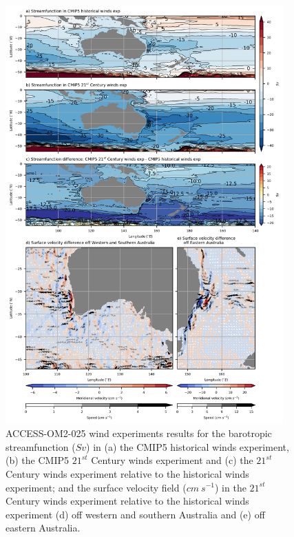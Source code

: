 \documentclass[draft,linenumbers]{agujournal2018}
\begin{document}
\begin{figure}[h]
\centering
\includegraphics[width=0.95\textwidth]{Bar_fig1_.png}
\caption{ACCESS-OM2-025 wind experiments results for the barotropic streamfunction ($Sv$) in (a) the CMIP5 historical winds experiment, (b) the CMIP5 $21^{st}$ Century winds experiment and (c) the $21^{st}$ Century winds experiment relative to the historical winds experiment; and the surface velocity field ($cm\ s^{-1}$) in the $21^{st}$ Century winds experiment relative to the historical winds experiment (d) off western and southern Australia and (e) off eastern Australia.}\label{Bar_fig1_}
\end{figure}


%
%
\end{document}
